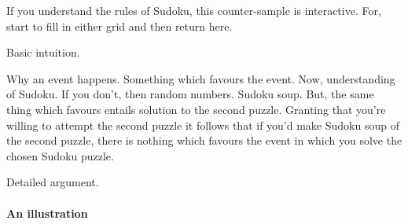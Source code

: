 \begin{note}
  \noindent%
  If you understand the rules of Sudoku, this counter-sample is interactive.
  For, start to fill in either grid and then return here.
\end{note}


\begin{note}
  Basic intuition.

  Why an event happens.
  Something which favours the event.
  Now, understanding of Sudoku.
  If you don't, then random numbers.
  Sudoku soup.
  But, the same thing which favours entails solution to the second puzzle.
  Granting that you're willing to attempt the second puzzle it follows that if you'd make Sudoku soup of the second puzzle, there is nothing which favours the event in which you solve the chosen Sudoku puzzle.
\end{note}


\begin{note}
  Detailed argument.
\end{note}



\paragraph*{An illustration}


